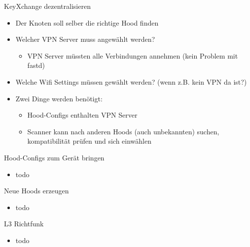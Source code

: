 \begin{frame}{KeyXchange dezentralisieren}
    \begin{itemize}
        \item Der Knoten soll selber die richtige Hood finden
        \item Welcher VPN Server muss angewählt werden?
        \begin{itemize}
            \item VPN Server müssten alle Verbindungen annehmen (kein
                Problem mit fastd)
        \end{itemize}
        \item Welche Wifi Settings müssen gewählt werden? (wenn z.B.
            kein VPN da ist?)
        \item Zwei Dinge werden benötigt: 
        \begin{itemize}
            \item Hood-Configs enthalten VPN Server
            \item Scanner kann nach anderen Hoods (auch unbekannten)
                suchen, kompatibilität prüfen und sich einwählen
        \end{itemize}
    \end{itemize}
\end{frame}

\begin{frame}{Hood-Configs zum Gerät bringen}
    \begin{itemize}
        \item todo
    \end{itemize}
\end{frame}

\begin{frame}{Neue Hoods erzeugen}
    \begin{itemize}
        \item todo
    \end{itemize}
\end{frame}

\begin{frame}{L3 Richtfunk}
    \begin{itemize}
        \item todo
    \end{itemize}
\end{frame}

